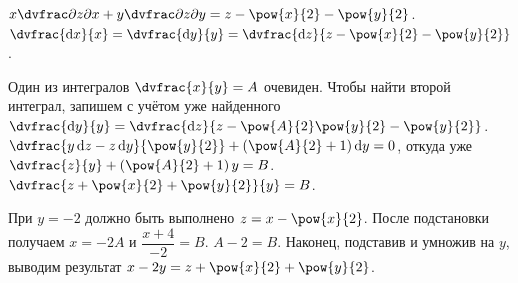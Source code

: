 \documentclass[a5paper,10pt]{article}
\begin{document}
    $x \vparder{z}{x} + y \vparder{z}{y} = z - \pow{x}{2} - \pow{y}{2}$.
    $\dvfrac {\di x} {x}
    = \dvfrac {\di y} {y}
    = \dvfrac {\di z} {z - \pow{x}{2} - \pow{y}{2}}$.

    Один из интегралов $\dvfrac {x}{y} = A$ очевиден. 
    Чтобы найти второй интеграл, запишем с учётом уже найденного
    $\dvfrac{\di y}{y} = \dvfrac{\di z}{z - \pow{A}{2}\pow{y}{2} - \pow{y}{2}}$.
    $\dvfrac{y \di z - z \di y}{\pow{y}{2}} + \br{\pow{A}{2} + 1} \di y = 0$,
    откуда уже
    $\dvfrac {z}{y} + \br{\pow{A}{2} + 1} y = B$.
    $\dvfrac{z + \pow{x}{2} + \pow{y}{2}}{y} = B$.

    При $y = -2$ должно быть выполнено
    $z = x - \pow{x}{2}$.
    После подстановки получаем
    $x = -2A$ и $\dfrac{x + 4}{-2} = B$.
    $A - 2 = B$. 
    Наконец, подставив и умножив на $y$, выводим результат
    $x - 2y = z + \pow{x}{2} + \pow{y}{2}$.
\end{document}
